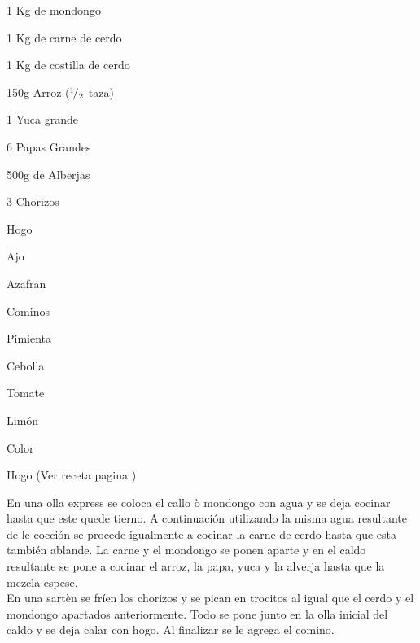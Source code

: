 

\begin{ingredientes}
\item 1 Kg de mondongo
\item 1 Kg de carne de cerdo
\item 1 Kg de costilla de cerdo
\item 150g Arroz (${}^{1}\!/_{2}$ taza)
\item 1 Yuca grande
\item 6 Papas Grandes
\item 500g de Alberjas
\item 3 Chorizos
\item Hogo
\item Ajo
\item Azafran
\item Cominos
\item Pimienta
\item Cebolla
\item Tomate
\item Limón
\item Color
\item Hogo (Ver receta pagina \pageref{hogo})
\end{ingredientes}
\preparacion
En una olla express se coloca el callo ò mondongo con agua y se deja cocinar hasta que este quede tierno. A continuación utilizando la misma agua resultante de le cocción se procede igualmente a cocinar la carne de cerdo hasta que esta también ablande. La carne y el mondongo se ponen aparte y en el caldo resultante se pone a cocinar el arroz, la papa, yuca y la alverja hasta que la mezcla espese.\\

En una sartèn se fríen los chorizos y se pican en trocitos al igual que el cerdo y el mondongo apartados anteriormente. Todo se pone junto en la olla inicial del caldo y se deja calar con hogo. Al finalizar se le agrega el comino.